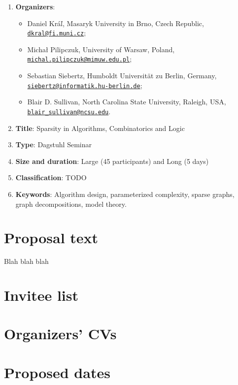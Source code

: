 \documentclass[10pt]{article}
\newcommand{\ourtitle}{Sparsity in Algorithms, Combinatorics and Logic}
\newcommand{\email}[1]{\href{mailto:#1}{\nolinkurl{#1}}}
\begin{document}
\begin{enumerate}
\item {\bf{Organizers}}:
\begin{itemize}
\item Daniel Kr\'a\v{l}, Masaryk University in Brno, Czech Republic, \email{dkral@fi.muni.cz};
\item Micha\l{} Pilipczuk, University of Warsaw, Poland, \email{michal.pilipczuk@mimuw.edu.pl};
\item Sebastian Siebertz, Humboldt Universit\"at zu Berlin, Germany, \email{siebertz@informatik.hu-berlin.de};
\item Blair D. Sullivan, North Carolina State University, Raleigh, USA, \email{blair_sullivan@ncsu.edu}.
\end{itemize}
\item {\bf{Title}}: \ourtitle
\item {\bf{Type}}: Dagstuhl Seminar
\item {\bf{Size and duration}}: Large (45 participants) and Long (5 days)
\item {\bf{Classification}}: TODO
\item {\bf{Keywords}}: Algorithm design, parameterized complexity, sparse graphs, graph decompositions, model theory.
\end{enumerate}

\section{Proposal text}

Blah blah blah~\cite{sparsity}










\section{Invitee list}



\section{Organizers' CVs}

\section{Proposed dates}





\end{document}
